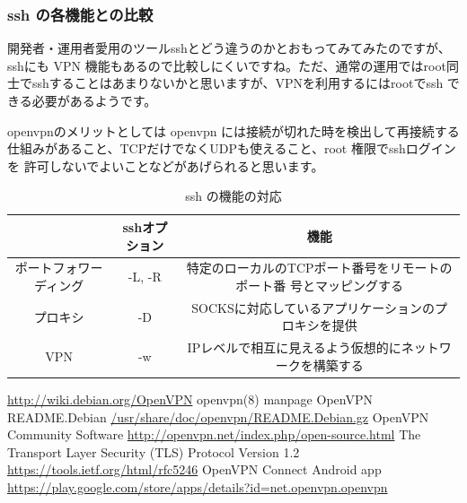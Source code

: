\documentclass[mingoth,a4paper]{jsarticle}
\begin{document}
\subsubsection{ssh の各機能との比較}

開発者・運用者愛用のツールsshとどう違うのかとおもってみてみたのですが、
sshにも VPN 機能もあるので比較しにくいですね。ただ、通常の運用ではroot同
士でsshすることはあまりないかと思いますが、VPNを利用するにはrootでssh で
きる必要があるようです。

openvpnのメリットとしては openvpn には接続が切れた時を検出して再接続する
仕組みがあること、TCPだけでなくUDPも使えること、root 権限でsshログインを
許可しないでよいことなどがあげられると思います。

\begin{table}[H]
 \caption{ssh の機能の対応}
 \begin{tabular}{|c|c|c|}
 \hline
 \hline
 & sshオプション & 機能 \\
 \hline
 ポートフォワーディング &  -L, -R & 特定のローカルのTCPポート番号をリモートのポート番
	 号とマッピングする \\
 \hline
 プロキシ & -D & SOCKSに対応しているアプリケーションのプロキシを提供 \\
 \hline
 VPN & -w & IPレベルで相互に見えるよう仮想的にネットワークを構築する \\
 \hline
 \hline
 \end{tabular}
\end{table}


\begin{thebibliography}{0}
  \url{http://wiki.debian.org/OpenVPN}
  openvpn(8) manpage
  OpenVPN README.Debian \url{/usr/share/doc/openvpn/README.Debian.gz}
  OpenVPN Community Software
	 \url{http://openvpn.net/index.php/open-source.html}
	 The Transport Layer Security (TLS) Protocol
	 Version 1.2
	 \url{https://tools.ietf.org/html/rfc5246}
 OpenVPN Connect Android app
	\url{https://play.google.com/store/apps/details?id=net.openvpn.openvpn}
\end{thebibliography}

\end{document}

